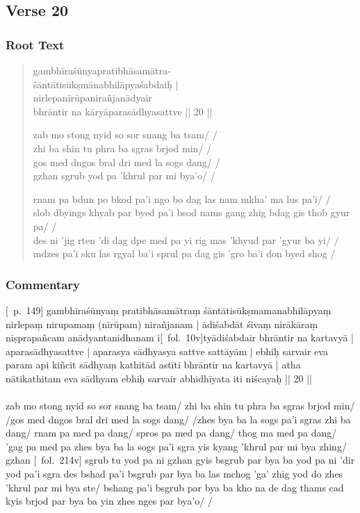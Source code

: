 \documentclass[12pt]{article}
\begin{document}
\subsection{Verse 20}
\subsubsection{Root Text}
\begin{quote}
	gambhīraśūnyapratibhāsamātra\footnoteB{
		°mātra°] \EDD ; mātraṃ \MS
	}-\\
	śāntāti\footnoteB{
		śāntāti] \EDD ; sāntādi \MS
	}sūkṣmānabhilāpyaśabdaiḥ |\\
	nirlepanīrūpa\footnoteB{
		nirlepanīrūpa°] \EDD\ (\emd) ; nirlepanīpa \MS
	}nirañjanādyair \\
	bhrāntir na kāryāparasādhyasattve || 20 ||

	zab mo stong nyid so sor snang ba tsam/ /\\
	zhi ba shin tu phra ba sgras brjod min/ /\\
	gos med dngos bral dri med la sogs dang/ /\\
	gzhan sgrub yod pa 'khrul par mi bya'o/ /

	rnam pa bdun po bkod pa'i ngo bo dag las nam mkha' ma lus pa'i/ /\\
	slob dbyings khyab par byed pa'i bsod nams gang zhig bdag gis thob gyur pa/ /\\
	des ni 'jig rten 'di dag dpe med pa yi rig mas 'khyud par 'gyur ba yi/ /\\
	mdzes pa'i sku las rgyal ba'i sprul pa dag gis 'gro ba'i don byed shog /
\end{quote}

\subsubsection{Commentary}
[\EDD\ p.\ 149] gambhīraśūnyaṃ pratibhāsamātraṃ śāntātisūkṣmamanabhilāpyaṃ nirlepaṃ nirupamaṃ (nīrūpam) nirañjanam | ādiśabdāt śivaṃ nirākāraṃ niṣprapañcam anādyantanidhanam i[\MS\ fol.\ 10v]tyādiśabdair bhrāntir na kartavyā | aparasādhyasattve | aparasya sādhyasya sattve sattāyām | ebhiḥ sarvair eva param api kiñcit sādhyaṃ kathitād astīti bhrāntir na kartavyā | atha nātikathitam eva sādhyam ebhiḥ sarvair abhidhīyata iti niścayaḥ || 20 ||\\

\textbf{\TVA}\\
zab mo stong nyid so sor snang ba tsam/ zhi ba shin tu phra ba sgras brjod min/ /gos med dngos bral dri med la sogs dang/ /zhes bya ba la sogs pa'i sgras zhi ba dang/ rnam pa med pa dang/ spros pa med pa dang/ thog ma med pa dang/ 'gag pa med pa zhes bya ba la sogs pa'i sgra yis kyang 'khrul par mi bya zhing/ gzhan [\TVA\ fol.\ 214v] sgrub tu yod pa ni gzhan gyis bsgrub par bya ba yod pa ni 'dir yod pa'i sgra des bshad pa'i bsgrub par bya ba las mchog 'ga' zhig yod do zhes 'khrul par mi bya ste/ bshang pa'i bsgrub par bya ba kho na de dag thams cad kyis brjod par bya ba yin zhes nges par bya'o/ /\\
\end{document}
